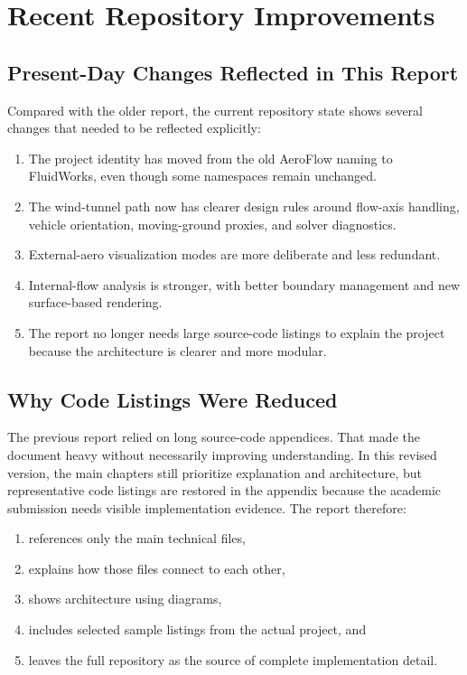 \documentclass[12pt,a4paper,titlepage]{report}
\newcommand{\LegacyProductName}{AeroFlow}
\begin{document}
\chapter{Recent Repository Improvements}
\section{Present-Day Changes Reflected in This Report}
Compared with the older report, the current repository state shows several changes that needed to be reflected explicitly:
\begin{enumerate}
\item The project identity has moved from the old \LegacyProductName{} naming to FluidWorks, even though some namespaces remain unchanged.
\item The wind-tunnel path now has clearer design rules around flow-axis handling, vehicle orientation, moving-ground proxies, and solver diagnostics.
\item External-aero visualization modes are more deliberate and less redundant.
\item Internal-flow analysis is stronger, with better boundary management and new surface-based rendering.
\item The report no longer needs large source-code listings to explain the project because the architecture is clearer and more modular.
\end{enumerate}

\section{Why Code Listings Were Reduced}
The previous report relied on long source-code appendices. That made the document heavy without necessarily improving understanding. In this revised version, the main chapters still prioritize explanation and architecture, but representative code listings are restored in the appendix because the academic submission needs visible implementation evidence. The report therefore:
\begin{enumerate}
\item references only the main technical files,
\item explains how those files connect to each other,
\item shows architecture using diagrams,
\item includes selected sample listings from the actual project, and
\item leaves the full repository as the source of complete implementation detail.
\end{enumerate}
\end{document}
